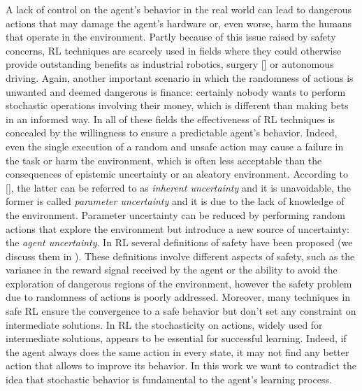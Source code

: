 A lack of control on the agent's behavior in the real world can lead to dangerous actions that may damage the agent's hardware or, even worse, harm the humans that operate in the environment. Partly because of this issue raised by safety concerns, \ac{RL} techniques are scarcely used in fields where they could otherwise provide outstanding benefits as industrial robotics, surgery [\cite{baek2018PathPlanning}] or autonomous driving. Again, another important scenario in which the randomness of actions is unwanted and deemed dangerous is finance: certainly nobody wants to perform stochastic operations involving their money, which is different than making bets in an informed way. In all of these fields the effectiveness of \ac{RL} techniques is concealed by the willingness to ensure a predictable agent's behavior. Indeed, even the single execution of a random and unsafe action may cause a failure in the task or harm the environment, which is often less acceptable than the consequences of epistemic uncertainty or an aleatory environment. According to [\cite{garcia2015}], the latter can be referred to as \emph{inherent uncertainty} and it is unavoidable, the former is called \emph{parameter uncertainty} and it is due to the lack of knowledge of the environment. Parameter uncertainty can be reduced by performing random actions that explore the environment but introduce a new source of uncertainty: the \emph{agent uncertainty}. In \ac{RL} several definitions of safety have been proposed (we discuss them in ). These definitions involve different aspects of safety, such as the variance in the reward signal received by the agent or the ability to avoid the exploration of dangerous regions of the environment, however the safety problem due to randomness of actions is poorly addressed. Moreover, many techniques in safe \ac{RL} ensure the convergence to a safe behavior but don't set any constraint on intermediate solutions. In \ac{RL} the stochasticity on actions, widely used for intermediate solutions, appears to be essential for successful learning. Indeed, if the agent always does the same action in every state, it may not find any better action that allows to improve its behavior. In this work we want to contradict the idea that stochastic behavior is fundamental to the agent's learning process.\\
\newline
